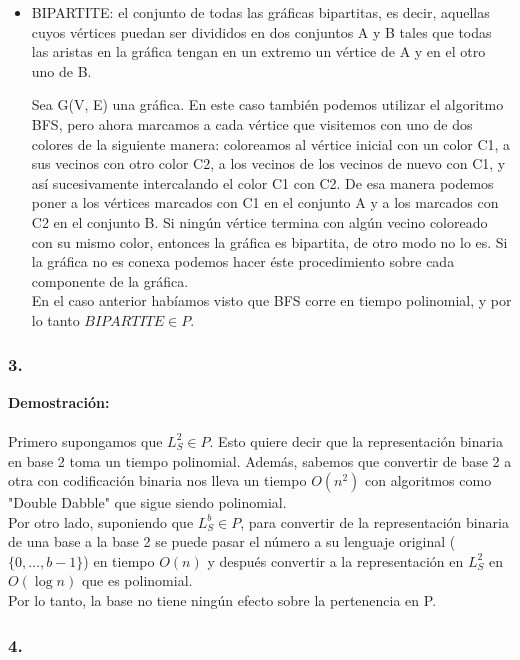 \documentclass[12pt]{article}
\begin{document}
\begin{itemize}
  \item BIPARTITE: el conjunto de todas las gráficas bipartitas, es decir, aquellas cuyos vértices puedan ser divididos en dos conjuntos A y B tales que todas las aristas en la gráfica tengan en un extremo un vértice de A y en el otro uno de B. 
  
    Sea G(V, E) una gráfica. En este caso también podemos utilizar el algoritmo BFS, pero ahora marcamos a cada vértice que visitemos con uno de dos colores de la siguiente manera: coloreamos al vértice inicial con un color C1, a sus vecinos con otro color C2, a los vecinos de los vecinos de nuevo con C1, y así sucesivamente intercalando el color C1 con C2. De esa manera podemos poner a los vértices marcados con C1 en el conjunto A y a los marcados con C2 en el conjunto B. Si ningún vértice termina con algún vecino coloreado con su mismo color, entonces la gráfica es bipartita, de otro modo no lo es. Si la gráfica no es conexa podemos hacer éste procedimiento sobre cada componente de la gráfica. \\

    En el caso anterior habíamos visto que BFS corre en tiempo polinomial, y por lo tanto $BIPARTITE \in P$.
  
  
 \end{itemize}

\subsubsection*{3.}
\textbf{Demostración:\\}
\\
Primero supongamos que $L_{S}^{2} \in P$.
Esto quiere decir que la representación binaria en base 2 toma un tiempo polinomial. Además,  sabemos que convertir de base 2 a otra con codificación binaria nos lleva un tiempo $O(n^2)$ con algoritmos como "Double Dabble" que sigue siendo polinomial.\\
Por otro lado, suponiendo que $L_{S}^{b} \in P$, para convertir de la representación binaria de una base a la base 2 se puede pasar el número a su lenguaje original ($\{0, \dots, b-1\}$) en tiempo $O(n)$ y después convertir a la representación en $L_{S}^{2}$ en $O(\log n)$ que es polinomial.\\
Por lo tanto, la base no tiene ningún efecto sobre la pertenencia en P. 
\subsubsection*{4.}
\end{document}
